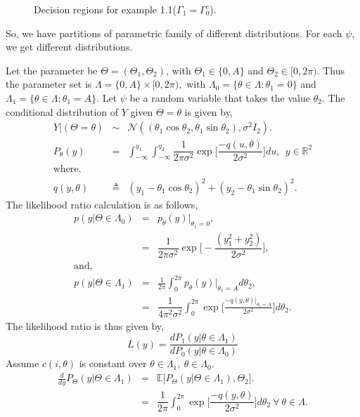 \documentclass[a4paper,english,12pt]{article}
\begin{document}
\begin{exmp}
\begin{figure}
\caption{Decision regions for example 1.1($\Gamma_1 = \Gamma_0^c$).}
\label{fig: example 1.1}
\end{figure}	
So, we have partitions of parametric family of different distributions. For each $\psi$, we get different distributions.
\par Let the parameter be $\Theta = (\Theta_1,\Theta_2)$, with $\Theta_1 \in \{0,A\}$ and $\Theta_2 \in [0,2\pi)$. Thus the parameter set is $\Lambda = \{0,A\}\times [0,2\pi),$ with $\Lambda_0 = \{\theta \in \Lambda : \theta_1 = 0\}$ and $\Lambda_1 = \{\theta \in \Lambda : \theta_1 = A\}$. Let $\psi$ be a random variable that takes the value $\theta_2$. The conditional distribution of $Y$ given $\Theta = \theta$ is given by,
\begin{eqnarray}
Y|(\Theta=\theta) &\sim& \mathcal{N} ((\theta_1\cos\theta_2,\theta_1\sin\theta_2), \sigma^2I_2).\\
P_\theta(y) &=& \int_{-\infty}^{y_1}\int_{-\infty}^{y_2}\dfrac{1}{2\pi\sigma^2}\exp\Big[\dfrac{-q(u,\theta)}{2\sigma^2}\Big]du, ~~ y \in {\mathbb{R}}^2\\
\mbox{where,}\nonumber\\
q(y,\theta) &\triangleq& (y_1-\theta_1\cos\theta_2)^2 + (y_2-\theta_1\sin\theta_2)^2.
\end{eqnarray}	
The likelihood ratio calculation is as follows,
\begin{eqnarray}
p(y|\Theta \in \Lambda_0) &=& p_\theta(y)|_{\theta_1 = 0},\\
&=& \dfrac{1}{2\pi\sigma^2}\exp\big[-\dfrac{(y_1^2 + y_2^2)}{2\sigma^2}\big],\\
\mbox{and,}\nonumber\\
p(y|\Theta \in \Lambda_1)&=& \frac{1}{2\pi}\int_{0}^{2\pi}p_\theta(y)|_{\theta_1 = A}d\theta_2,\\
&=& \dfrac{1}{4\pi^2\sigma^2}\int_{0}^{2\pi}\exp\big[\frac{-q(y,\theta)|_{\theta_1 = A}}{2\sigma^2}\big]d\theta_2.
\end{eqnarray} 	
The likelihood ratio is thus given by,
\begin{equation}
L(y) = \frac{dP_1(y| \theta \in \Lambda_1)}{dP_0(y| \theta \in \Lambda_0)}
\end{equation}
Assume $c(i,\theta)$ is constant over $\theta \in \Lambda_1,~\theta \in \Lambda_0$.
\begin{eqnarray}
\frac{d}{dy}P_\Theta(y | \Theta \in \Lambda_1) &=& \mathbb{E}\big[P_\Theta(y | \Theta \in \Lambda_1), \Theta_2]. \\
&=& \dfrac{1}{2\pi}\int_{0}^{2\pi}\exp\Big[\dfrac{-q(y,\theta)}{2\sigma^2}\Big]d\theta_2 ~ \forall ~ \theta \in \Lambda.

\end{eqnarray}
\end{exmp}
\end{document}
